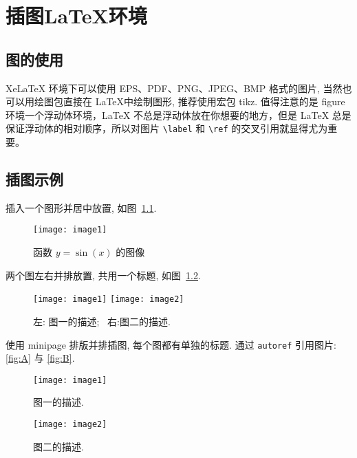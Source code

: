 \documentclass[UTF8,openany,twoside,12pt]{ctexbook}
\theoremstyle{plain}
\begin{document}

\chapter{插图LaTeX环境}

\section{图的使用}

XeLaTeX 环境下可以使用 EPS、PDF、PNG、JPEG、BMP 格式的图片, 当然也可以用绘图包直接在 \LaTeX 中绘制图形, 推荐使用宏包 tikz. 值得注意的是 figure 环境一个浮动体环境，LaTeX 不总是浮动体放在你想要的地方，但是 LaTeX 总是保证浮动体的相对顺序，所以对图片 \verb|\label| 和 \verb|\ref| 的交叉引用就显得尤为重要。

\section{插图示例}

插入一个图形并居中放置, 如图~\ref{fig:sinx}.
\begin{figure}[htp!]
  \centering
  \texttt{[image: image1]}
  \caption{函数 $y=\sin(x)$ 的图像}\label{fig:sinx}
\end{figure}

\clearpage
两个图左右并排放置, 共用一个标题, 如图~\ref{fig:twofigs}.
\begin{figure}[htp!]
  \centering
  \texttt{[image: image1]}
  \hfill
  \texttt{[image: image2]}
  \caption{左: 图一的描述;~ 右:图二的描述.}
  \label{fig:twofigs}
\end{figure}


使用 minipage 排版并排插图, 每个图都有单独的标题. 通过 \verb|autoref| 引用图片: \autoref{fig:A} 与 \autoref{fig:B}.
\begin{figure}[htp!]
\begin{minipage}[t]{0.48\linewidth}
  \centering
  \texttt{[image: image1]}
  \caption{图一的描述.}
  \label{fig:A}
\end{minipage}
\hfill
\begin{minipage}[t]{0.48\linewidth}
\centering
   \texttt{[image: image2]}
   \caption{图二的描述.}
   \label{fig:B}
\end{minipage}
\end{figure}

\end{document}
